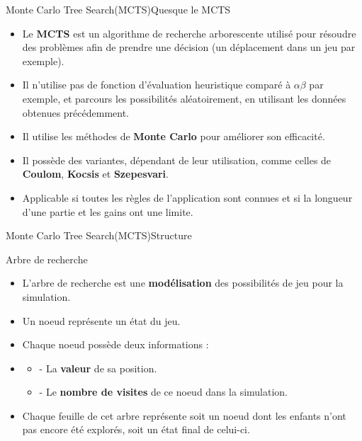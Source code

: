 \begin{frame}{Monte Carlo Tree Search(MCTS)}{Quesque le MCTS}
	\begin{block}{}
		\begin{itemize}
			\item Le \textbf{MCTS} est un algorithme de recherche arborescente utilisé pour résoudre des problèmes afin de prendre une décision (un déplacement dans un jeu par exemple).
			\item Il n'utilise pas de fonction d'évaluation heuristique comparé à \textbf{$\alpha$$\beta$} par exemple, et parcours les possibilités aléatoirement, en utilisant les données obtenues précédemment.
			\item Il utilise les méthodes de \textbf{Monte Carlo} pour améliorer son efficacité.
			\item Il possède des variantes, dépendant de leur utilisation, comme celles de \textbf{Coulom}, \textbf{Kocsis} et \textbf{Szepesvari}.
			\item Applicable si toutes les règles de l'application sont connues et si la longueur d'une partie et les gains ont une limite.	
		\end{itemize}
	\end{block}
\end{frame}

\begin{frame}{Monte Carlo Tree Search(MCTS)}{Structure}
	\begin{block}{Arbre de recherche}
		\begin{itemize}
			\item L'arbre de recherche est une \textbf{modélisation} des possibilités de jeu pour la simulation.
			\item Un noeud représente un état du jeu.
			\item Chaque noeud possède deux informations :
			\item\begin{itemize}
				\item - La \textbf{valeur} de sa position.
				\item - Le \textbf{nombre de visites} de ce noeud dans la simulation.
			\end{itemize}
			\item Chaque feuille de cet arbre représente soit un noeud dont les enfants n'ont pas encore été explorés, soit un état final de celui-ci.		
		\end{itemize}
	\end{block}
\end{frame}

